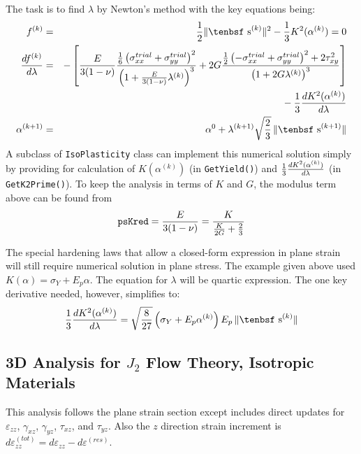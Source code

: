 \documentclass[11pt]{article}
\def\dev{\hbox{\tenbsf s}}
\def\code#1{{\small\tt #1}}
\def\e#1{\varepsilon_{#1}}
\def\er#1{\varepsilon_{#1}^{(res)}}
\def\s#1{\sigma_{#1}}
\begin{document}
The task is to find $\lambda$ by Newton's method with the key equations being:
\begin{eqnarray}
        f^{(k)} & = & {1\over 2}\|\dev^{(k)}\|^2 -  {1\over 3} K^2(\alpha^{(k)}) = 0 \\
        {df^{(k)}\over d\lambda} & = & -\left[{ E\over 3(1-\nu)}{{1\over 6}\left( \s{xx}^{trial} +  \s{yy}^{trial} \right)^2 \over
                                                     \left( 1 + { E\over 3(1-\nu)}\lambda^{(k)}\right)^3}
             + 2G{{1\over 2}\left( -\s{xx}^{trial} +  \s{yy}^{trial} \right)^2 + 2\tau_{xy}^2 \over \left(1 + 2 G\lambda^{(k)}\right)^3}\right]  
 \nonumber \\
 &&\qquad\mbox{}
                                       - {1\over 3}{dK^2(\alpha^{(k)})\over d\lambda}  \\
        \alpha^{(k+1)} & = & \alpha^{0} +  \lambda^{(k+1)} \sqrt{2\over3}\thinspace \|\dev^{(k+1)}\|
\end{eqnarray}
A subclass of \code{IsoPlasticity} class can implement this numerical solution simply by providing for calculation of $K(\alpha^{(k)})$ (in \code{GetYield()}) and ${1\over3}{dK^2(\alpha^{(k)})\over d\lambda}$ (in \code{GetK2Prime()}). To keep the analysis in terms of $K$ and $G$, the modulus term above can be found from
\begin{equation}
       \code{psKred} = { E\over 3(1-\nu)} = {K \over {K\over 2G} + {2\over 3}} 
\end{equation}

The special hardening laws that allow a closed-form expression in plane strain will still require numerical solution in plane stress. The example given above used $K(\alpha)=\sigma_Y + E_p\alpha$. The equation for $\lambda$ will be quartic expression. The one key derivative needed, however, simplifies to:
\begin{equation}
      {1\over3}{dK^2(\alpha^{(k)})\over d\lambda} = \sqrt{8\over27}
           \left(\sigma_Y + E_p\alpha^{(k)}\right)E_p\thinspace \|\dev^{(k)}\|
\end{equation}


\subsection{3D Analysis for $J_2$ Flow Theory, Isotropic Materials}

This analysis follows the plane strain section except includes direct updates for $\e{zz}$, $\gamma_{xz}$, $\gamma_{yz}$, $\tau_{xz}$, and $\tau_{yz}$. Also the $z$ direction strain increment is $d\varepsilon_{zz}^{(tot)} = d\varepsilon_{zz} - d\er{}$.
\end{document}
